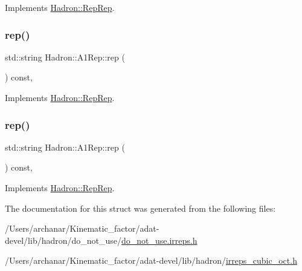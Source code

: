 Implements \mbox{\hyperlink{structHadron_1_1RepRep_ab3213025f6de249f7095892109575fde}{Hadron\+::\+Rep\+Rep}}.

\mbox{\label{structHadron_1_1A1Rep_a6b592d902063cfea9bd1cedcdeb9ac79}} 
\subsubsection{\texorpdfstring{rep()}{rep()}\hspace{0.1cm}{\footnotesize\ttfamily [4/5]}}
{\footnotesize\ttfamily std\+::string Hadron\+::\+A1\+Rep\+::rep (\begin{DoxyParamCaption}{ }\end{DoxyParamCaption}) const\hspace{0.3cm}{\ttfamily [inline]}, {\ttfamily [virtual]}}



Implements \mbox{\hyperlink{structHadron_1_1RepRep_ab3213025f6de249f7095892109575fde}{Hadron\+::\+Rep\+Rep}}.

\mbox{\label{structHadron_1_1A1Rep_a6b592d902063cfea9bd1cedcdeb9ac79}} 
\subsubsection{\texorpdfstring{rep()}{rep()}\hspace{0.1cm}{\footnotesize\ttfamily [5/5]}}
{\footnotesize\ttfamily std\+::string Hadron\+::\+A1\+Rep\+::rep (\begin{DoxyParamCaption}{ }\end{DoxyParamCaption}) const\hspace{0.3cm}{\ttfamily [inline]}, {\ttfamily [virtual]}}



Implements \mbox{\hyperlink{structHadron_1_1RepRep_ab3213025f6de249f7095892109575fde}{Hadron\+::\+Rep\+Rep}}.



The documentation for this struct was generated from the following files\+:\begin{DoxyCompactItemize}
\item 
/\+Users/archanar/\+Kinematic\+\_\+factor/adat-\/devel/lib/hadron/do\+\_\+not\+\_\+use/\mbox{\hyperlink{adat-devel_2lib_2hadron_2do__not__use_2do__not__use_8irreps_8h}{do\+\_\+not\+\_\+use.\+irreps.\+h}}\item 
/\+Users/archanar/\+Kinematic\+\_\+factor/adat-\/devel/lib/hadron/\mbox{\hyperlink{adat-devel_2lib_2hadron_2irreps__cubic__oct_8h}{irreps\+\_\+cubic\+\_\+oct.\+h}}\end{DoxyCompactItemize}
